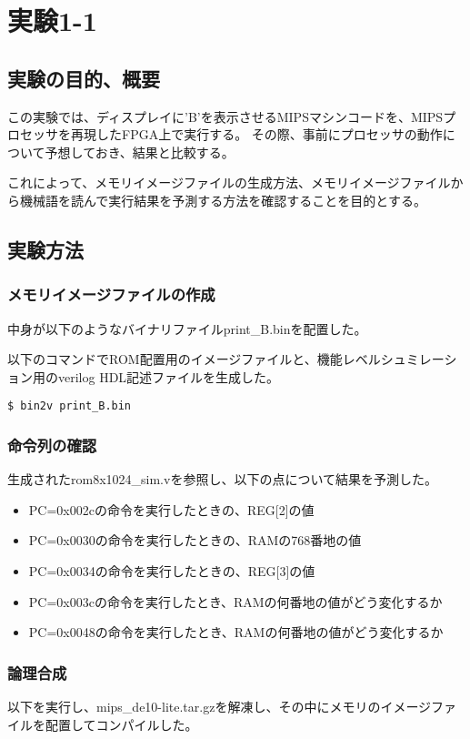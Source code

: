 \section{実験1-1}
\subsection{実験の目的、概要}
この実験では、ディスプレイに'B'を表示させるMIPSマシンコードを、MIPSプロセッサを再現したFPGA上で実行する。
その際、事前にプロセッサの動作について予想しておき、結果と比較する。

これによって、メモリイメージファイルの生成方法、メモリイメージファイルから機械語を読んで実行結果を予測する方法を確認することを目的とする。

\subsection{実験方法}
\subsubsection{メモリイメージファイルの作成}
中身が以下のようなバイナリファイルprint\_B.binを配置した。


以下のコマンドでROM配置用のイメージファイルと、機能レベルシュミレーション用のverilog HDL記述ファイルを生成した。
\begin{lstlisting}[caption={イメージファイルの作成},label={イメージファイルの作成1-1}]
  $ bin2v print_B.bin
\end{lstlisting}

\subsubsection{命令列の確認}
生成されたrom8x1024\_sim.vを参照し、以下の点について結果を予測した。
\begin{itemize}
  \item PC=0x002cの命令を実行したときの、REG[2]の値
  \item PC=0x0030の命令を実行したときの、RAMの768番地の値
  \item PC=0x0034の命令を実行したときの、REG[3]の値
  \item PC=0x003cの命令を実行したとき、RAMの何番地の値がどう変化するか
  \item PC=0x0048の命令を実行したとき、RAMの何番地の値がどう変化するか
\end{itemize}

\subsubsection{論理合成}
以下を実行し、mips\_de10-lite.tar.gzを解凍し、その中にメモリのイメージファイルを配置してコンパイルした。

